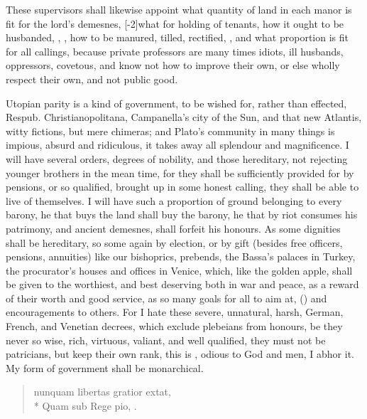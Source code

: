 {These supervisors shall likewise appoint what quantity of land in each
manor is fit for the lord's demesnes, [-2\baselineskip]what for holding of tenants,
how it ought to be husbanded, , , how to be manured, tilled, rectified, , and what proportion is fit for all callings, because
private professors are many times idiots, ill husbands, oppressors,
covetous, and know not how to improve their own, or else wholly respect
their own, and not public good.

Utopian parity is a kind of government, to be wished for, rather
than effected, Respub. Christianopolitana, Campanella's city of the
Sun, and that new Atlantis, witty fictions, but mere chimeras; and
Plato's community in many things is impious, absurd and ridiculous, it
takes away all splendour and magnificence. I will have several orders,
degrees of nobility, and those hereditary, not rejecting younger
brothers in the mean time, for they shall be sufficiently provided for
by pensions, or so qualified, brought up in some honest calling, they
shall be able to live of themselves. I will have such a proportion of
ground belonging to every barony, he that buys the land shall buy the
barony, he that by riot consumes his patrimony, and ancient demesnes,
shall forfeit his honours. As some dignities shall be hereditary,
so some again by election, or by gift (besides free officers, pensions,
annuities) like our bishoprics, prebends, the Bassa's palaces in
Turkey, the procurator's houses and offices in Venice, which, like
the golden apple, shall be given to the worthiest, and best deserving
both in war and peace, as a reward of their worth and good service, as
so many goals for all to aim at, () and encouragements
to others. For I hate these severe, unnatural, harsh, German, French,
and Venetian decrees, which exclude plebeians from honours, be they
never so wise, rich, virtuous, valiant, and well qualified, they must
not be patricians, but keep their own rank, this is , odious to God and men, I abhor it. My form of government shall
be monarchical.

\begin{verse}
\textlatin{nunquam libertas gratior extat,}\\*
\textlatin{Quam sub Rege pio, \etc.}
\end{verse}

}
